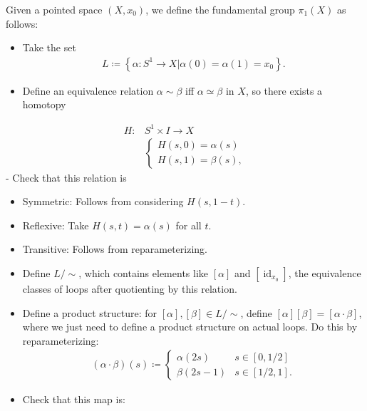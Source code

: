 \begin{definition}

Given a pointed space \((X,x_{0})\), we define the fundamental group
\(\pi_{1}(X)\) as follows:

\begin{itemize}
\item
  Take the set
  \begin{align*}
  L \coloneqq\left\{{\alpha: S^1\to X \mathrel{\Big|}\alpha(0) = \alpha(1) = x_{0}}\right\}
  .\end{align*}
\item
  Define an equivalence relation \(\alpha \sim \beta\) iff
  \(\alpha \simeq\beta\) in \(X\), so there exists a homotopy
\end{itemize}

\begin{align*}
H: &S^1 \times I  \to X \\ 
&
\begin{cases}
H(s, 0) = \alpha(s)\\
H(s, 1) = \beta(s) ,
\end{cases}
\end{align*}
- Check that this relation is

\begin{itemize}
\item
  Symmetric: Follows from considering \(H(s, 1-t)\).
\item
  Reflexive: Take \(H(s, t) = \alpha (s)\) for all \(t\).
\item
  Transitive: Follows from reparameterizing.
\item
  Define \(L/\sim\), which contains elements like \([\alpha]\) and
  \([\operatorname{id}_{x_{0}}]\), the equivalence classes of loops
  after quotienting by this relation.
\item
  Define a product structure: for \([\alpha], [\beta] \in L/\sim\),
  define \([\alpha][\beta] = [\alpha \cdot \beta]\), where we just need
  to define a product structure on actual loops. Do this by
  reparameterizing:
  \begin{align*}
  (\alpha \cdot \beta )(s) \coloneqq
  \begin{cases}
  \alpha (2s) &  s \in [0, 1/2]
  \\
  \beta (2s-1) & 
  s \in [1/2, 1]
  .
  \end{cases}
  \end{align*}
\item
  Check that this map is:


\end{itemize}
\end{definition}
